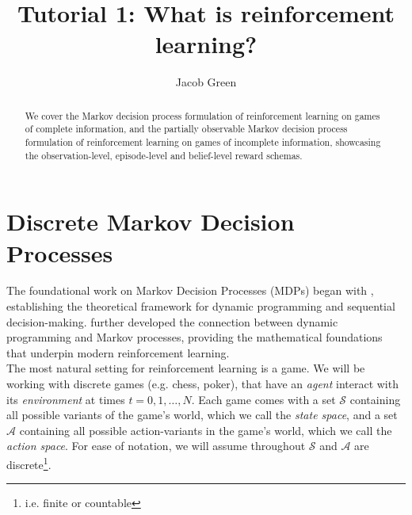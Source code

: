 \documentclass[12pt]{article}
\title{Tutorial 1: What is reinforcement learning?}
\author{Jacob Green}
\date{}
\begin{document}
 

\begin{titlepage}
    \maketitle
    \begin{abstract}
    We cover the Markov decision process formulation of reinforcement learning on games of complete information, and the 
    partially observable Markov decision process formulation of reinforcement learning on games of incomplete information, 
    showcasing the observation-level, episode-level and belief-level reward schemas. 
\end{abstract}
\end{titlepage}

\newpage

\section{Discrete Markov Decision Processes}

The foundational work on Markov Decision Processes (MDPs) began with \citet{bellman_1957_dynamic}, establishing the theoretical 
framework for dynamic programming and sequential decision-making. \citet{howard_1960_dynamic} further developed the connection 
between dynamic programming and Markov processes, providing the mathematical foundations that underpin modern reinforcement 
learning. \\

The most natural setting for reinforcement learning is a game. We will be working with discrete games (e.g. chess, poker), 
that have an \textit{agent} interact with its \textit{environment} at times $t = 0, 1, \dots, N$. Each game comes with a set 
$\mathcal{S}$ containing all possible variants of the game's world, which we call the \textit{state space}, and a set 
$\mathcal{A}$ containing all possible action-variants in the game's world, which we call the \textit{action space}. For ease of 
notation, we will assume throughout $\mathcal{S}$ and $\mathcal{A}$ are discrete\footnote{
    i.e. finite or countable
}. 
\end{document}
